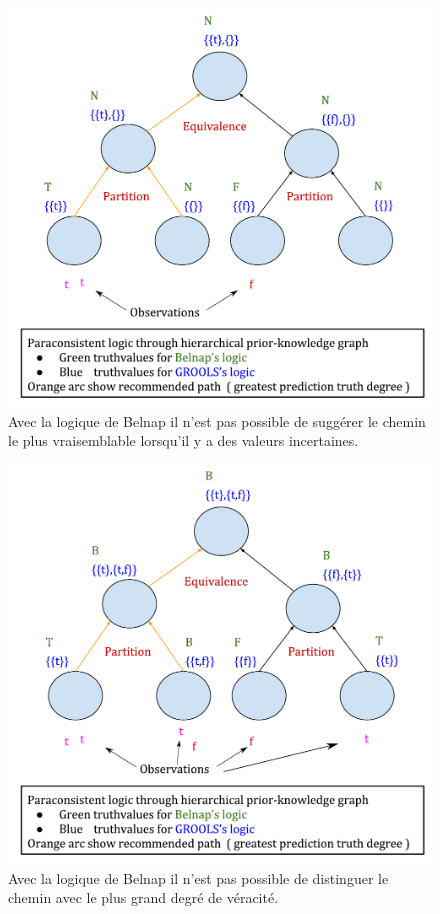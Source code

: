 \begin{refsegment}
\begin{shadedfigure}[H]
	\begin{subfigure}[t]{.48\textwidth}
		\centering
		\includegraphics[width=\textwidth]{img/GROOLS_vs_belnap_1.pdf}
		\caption{Avec la logique de Belnap il n'est pas possible de suggérer le chemin le plus vraisemblable lorsqu'il y a des valeurs incertaines.}
		\label{fig:grools_belnap_1}
	\end{subfigure}
	\hfill
	\begin{subfigure}[t]{.48\textwidth}
		\centering
		\includegraphics[width=\textwidth]{img/GROOLS_vs_belnap_2.pdf}
		\caption{Avec la logique de Belnap il n'est pas possible de distinguer le chemin avec le plus grand degré de véracité. }
		\label{fig:grools_belnap_2}
	\end{subfigure}
	\label{fig:grools_belnap}
\end{shadedfigure}


\end{refsegment}

